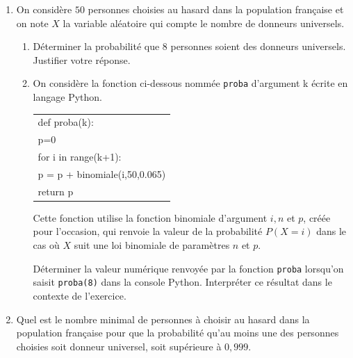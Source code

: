 \documentclass[10pt]{article}
\begin{document}
\begin{enumerate}
\item On considère $50$ personnes choisies au hasard dans la population française et on note $X$ la variable aléatoire qui compte le nombre de donneurs universels.
	\begin{enumerate}
		\item Déterminer la probabilité que 8 personnes soient des donneurs universels. Justifier votre réponse.
		\item On considère la fonction ci-dessous nommée \texttt{proba} d'argument k écrite en langage Python.
		
\begin{center}
\begin{tabular}{|l|}\hline
def proba(k):\\
\quad p=0\\
\quad for i in range(k+1):\\
\quad \quad p = p + binomiale(i,50,0.065)\\ 
\quad return p\\ \hline
\end{tabular}
\end{center}
Cette fonction utilise la fonction binomiale d'argument $i, n$ et $p$, créée pour l'occasion, qui renvoie la valeur de la probabilité $P(X = i)$ dans le cas où $X$ suit une loi binomiale de paramètres $n$ et $p$.

Déterminer la valeur numérique renvoyée par la fonction \texttt{proba} lorsqu'on saisit \texttt{proba(8)} dans la console Python. Interpréter ce résultat dans le contexte de l'exercice.
	\end{enumerate}
\item Quel est le nombre minimal de personnes à choisir au hasard dans la population française pour que la probabilité qu'au moins une des personnes choisies soit donneur universel, soit supérieure à $0,999$.
\end{enumerate}

\bigskip
\end{document}
